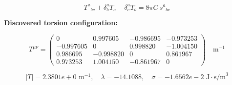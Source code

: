 
\begin{equation}
  T^a{}_{bc} + \delta^a_b T_c - \delta^a_c T_b = 8\pi G \, s^a{}_{bc}
\end{equation}

\textbf{Discovered torsion configuration:}

\begin{equation}
  T^{\mu\nu} = \begin{pmatrix}
    0 & 0.997605 & -0.986695 & -0.973253 \\
    -0.997605 & 0 & 0.998820 & -1.004150 \\
    0.986695 & -0.998820 & 0 & 0.861967 \\
    0.973253 & 1.004150 & -0.861967 & 0
  \end{pmatrix} \quad \text{m}^{-1}
\end{equation}

\begin{equation}
  |T| = 2.3801e+0 \text{ m}^{-1}, \quad
  \lambda = -14.1088, \quad
  \sigma = -1.6562e-2 \text{ J}\cdot\text{s/m}^3
\end{equation}